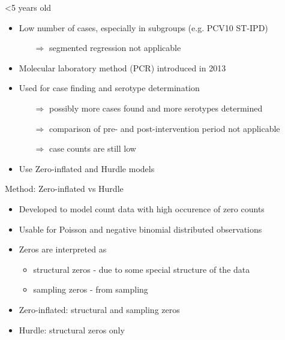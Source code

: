 \documentclass{beamer}\usepackage[]{graphicx}\usepackage[]{color}
\begin{document}
\begin{frame}[fragile]{<5 years old}
\begin{center}
\begin{itemize}
  \item Low number of cases, especially in subgroups (e.g. PCV10 ST-IPD)
  \begin{itemize}
    \item [$\Rightarrow$] segmented regression not applicable
  \end{itemize}
  \item \glqq{}Molecular\grqq{} laboratory method (PCR) introduced in 2013
    \item Used for case finding and serotype determination
  \begin{itemize}
    \item [$\Rightarrow$] possibly more cases found and more serotypes determined
    \item [$\Rightarrow$] comparison of pre- and post-intervention period not applicable
    \item [$\Rightarrow$] case counts are still low
  \end{itemize}
  \item Use Zero-inflated and Hurdle models
\end{itemize}
\end{center}
\end{frame}

\begin{frame}[fragile]{Method: Zero-inflated vs Hurdle}
\begin{center}
\begin{itemize}
  \item Developed to model count data with high occurence of zero counts
  \item Usable for Poisson and negative binomial distributed observations
  \item Zeros are interpreted as
  \begin{itemize}
    \item structural zeros - due to some special structure of the data
    \item sampling zeros - from sampling
  \end{itemize}
  \item Zero-inflated: structural and sampling zeros
  \item Hurdle: structural zeros only
\end{itemize}
\end{center}
\end{frame}
\end{document}
